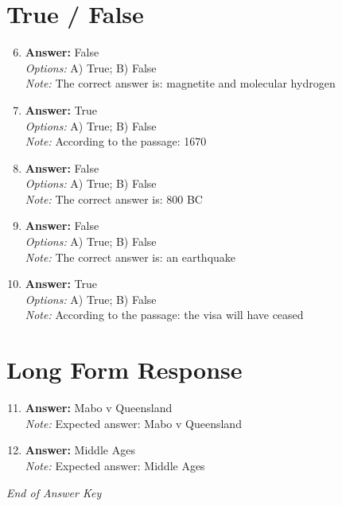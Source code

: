 \documentclass[12pt]{article}
\begin{document}
\section*{True / False}
\begin{enumerate}[label=\arabic*.]
\setcounter{enumi}{5}
\item \textbf{Answer:} False
\\ \textit{Options:} A) True; B) False
\\ \textit{Note:} The correct answer is: magnetite and molecular hydrogen
\item \textbf{Answer:} True
\\ \textit{Options:} A) True; B) False
\\ \textit{Note:} According to the passage: 1670
\item \textbf{Answer:} False
\\ \textit{Options:} A) True; B) False
\\ \textit{Note:} The correct answer is: 800 BC
\item \textbf{Answer:} False
\\ \textit{Options:} A) True; B) False
\\ \textit{Note:} The correct answer is: an earthquake
\item \textbf{Answer:} True
\\ \textit{Options:} A) True; B) False
\\ \textit{Note:} According to the passage: the visa will have ceased
\end{enumerate}

\section*{Long Form Response}
\begin{enumerate}[label=\arabic*.]
\setcounter{enumi}{10}
\item \textbf{Answer:} Mabo v Queensland
\\ \textit{Note:} Expected answer: Mabo v Queensland
\item \textbf{Answer:} Middle Ages
\\ \textit{Note:} Expected answer: Middle Ages
\end{enumerate}

\vfill
\noindent\textit{End of Answer Key}
\end{document}
